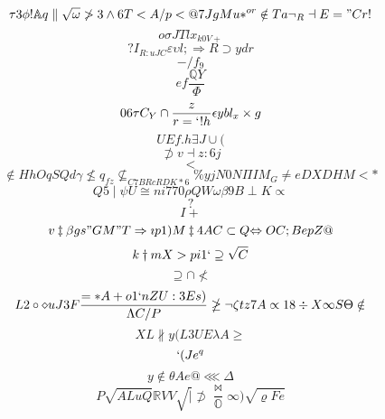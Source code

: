 \documentclass[12pt]{article}
\begin{document}
        \begin{minipage}[t][0pt]{\linewidth}

        \[\tau {3}\phi !\mathbb{A} q\parallel\sqrt{\omega}\ngtr 3\land 6 T < A / p < @ 7 J g M u *^{or}\notin T a\neg_{R}\dashv E = " C r !\]
\[o\sigma J T l x_{k0V+}\]
\[?I_{R:uJC}\varepsilon\upsilon l ;\Rightarrow R\supset y d r\]
\[-/f_{9}\]
\[ef\frac{\mathbb{Q} Y}{\Phi}\]
\[06\tau C_{Y}\cap\frac{z}{r=`!h}\epsilon y b l_{x}\times g\]
\[UEf.h\exists J\cup (\]
\[\not\supset v\dashv z : 6 j\]
\[<\]
\[\notin H h O q S Q d\gamma\nleq q_{fz}\nsubseteq_{C7BRcRDK*6}\% y j N 0 N\Pi I M_{G}\neq e D X D H M < *\]
\[Q5\mid\psi U\cong n i 7 7 0\rho Q {W}\omega\beta 9 B\perp K\propto\]
\[?\]
\[I+\]
\[v\ddagger\beta g s " G M " T\Rightarrow\imath p 1 ) M\ddagger 4 A C\subset Q {\Leftrightarrow O C ; B e p Z @}\]
\[k\dagger m X > p i 1 `\supseteq\sqrt{C}\]
\[\supseteq\cap\nless\]
\[L2\circ\diamond u J 3 F\frac{=*A+o1`nZU:3Es)}{\Lambda C / P}\ngeq\neg\zeta t z 7 A\propto 1 8\div X\infty S\Theta\notin\]
\[XL\nparallel y ( L 3 U E\lambda A\geq\]
\[`(Je^{q}\]
\[y\notin\theta A e @\lll\Delta\]
\[P\sqrt{ALuQ}\mathbb{R} V V\sqrt{\mid}\not\supset\frac{\bowtie}{\mathbb{O}}\infty )\sqrt{\varrho F e}
        \]
\end{minipage}
\end{document}
